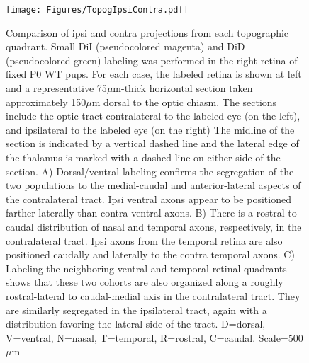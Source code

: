 \begin{figure}[hbtp]
    \begin{center}
        \texttt{[image: Figures/TopogIpsiContra.pdf]}
        \caption[Comparison of ipsi and contra projections from each topographic quadrant.]
        {Comparison of ipsi and contra projections from each topographic quadrant.
        Small DiI (pseudocolored magenta) and DiD (pseudocolored green) labeling was performed in the right retina of fixed P0 WT pups.
        For each case, the labeled retina is shown at left and a representative 75$\mu$m-thick horizontal section taken approximately 150$\mu$m dorsal to the optic chiasm.
        The sections include the optic tract contralateral to the labeled eye (on the left), and ipsilateral to the labeled eye (on the right)
        The midline of the section is indicated by a vertical dashed line and the lateral edge of the thalamus is marked with a dashed line on either side of the section.
        A) Dorsal/ventral labeling confirms the segregation of the two populations to the medial-caudal and anterior-lateral aspects of the contralateral tract.
        Ipsi ventral axons appear to be positioned farther laterally than contra ventral axons.
        B) There is a rostral to caudal distribution of nasal and temporal axons, respectively, in the contralateral tract.
        Ipsi axons from the temporal retina are also positioned caudally and laterally to the contra temporal axons.
        C) Labeling the neighboring ventral and temporal retinal quadrants shows that these two cohorts are also organized along a roughly rostral-lateral to caudal-medial axis in the contralateral tract.
        They are similarly segregated in the ipsilateral tract, again with a distribution favoring the lateral side of the tract.
        D=dorsal, V=ventral, N=nasal, T=temporal, R=rostral, C=caudal. Scale=500$\mu$m}
        \label{Figures/TopogIpsiContra}
    \end{center}
\end{figure}

